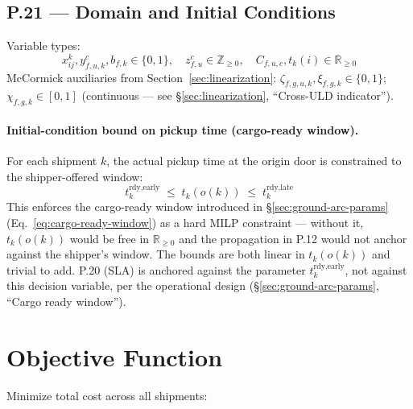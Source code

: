\documentclass[11pt,a4paper]{article}
\theoremstyle{definition}
\begin{document}
\subsection*{P.21 — Domain and Initial Conditions}

Variable types:
\begin{equation}
  x_{ij}^k, y_{f,u,k}^c, b_{f,k} \in \{0,1\}, \quad
  z_{f,u}^c \in \mathbb{Z}_{\geq 0}, \quad
  C_{f,u,c}, t_k(i) \in \mathbb{R}_{\geq 0}
  \label{eq:P21-domain}
\end{equation}
McCormick auxiliaries from Section~\ref{sec:linearization}: $\zeta_{f,g,u,k}, \xi_{f,g,k} \in \{0,1\}$;
$\chi_{f,g,k} \in [0,1]$ (continuous --- see \S\ref{sec:linearization}, ``Cross-ULD indicator'').

\paragraph{Initial-condition bound on pickup time (cargo-ready window).}
For each shipment $k$, the actual pickup time at the origin door is constrained to
the shipper-offered window:
\begin{equation}
  t_k^{\text{rdy,early}} \;\leq\; t_k(o(k)) \;\leq\; t_k^{\text{rdy,late}}
  \label{eq:P21-pickup-window}
\end{equation}
This enforces the cargo-ready window introduced in \S\ref{sec:ground-arc-params} (Eq.~\ref{eq:cargo-ready-window})
as a hard MILP constraint --- without it, $t_k(o(k))$ would be free in $\mathbb{R}_{\geq 0}$
and the propagation in P.12 would not anchor against the shipper's window. The bounds
are both linear in $t_k(o(k))$ and trivial to add. P.20 (SLA) is anchored against the
parameter $t_k^{\text{rdy,early}}$, not against this decision variable, per the
operational design (\S\ref{sec:ground-arc-params}, ``Cargo ready window'').

\section{Objective Function}
\label{sec:objective}

Minimize total cost across all shipments:
\end{document}
